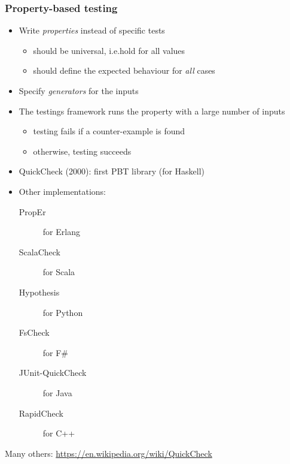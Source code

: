 \documentclass{beamer}
\begin{document}
\begin{frame}[allowframebreaks]
  \frametitle{Property-based testing}

\begin{itemize}
\item Write \emph{properties} instead of specific tests
\begin{itemize}
\item should be universal, i.e.\@ hold for all values
\item should define the expected behaviour for \emph{all} cases
\end{itemize}
\item Specify \emph{generators} for the inputs
\item The testings framework runs the property with
  a large number of inputs
  \begin{itemize}
  \item testing fails if a \alert{counter-example} is found
  \item otherwise, testing succeeds
  \end{itemize}
\end{itemize}

\framebreak

\begin{itemize}
\item QuickCheck (2000): first PBT library (for Haskell)
\item Other implementations:
  \begin{description}
  \item[PropEr] for Erlang
  \item[ScalaCheck] for Scala
  \item[Hypothesis] for Python
  \item[FsCheck] for F\#
  \item[JUnit-QuickCheck] for Java
  \item[RapidCheck] for C++
  \end{description}
\end{itemize}
\bigskip

Many others: \url{https://en.wikipedia.org/wiki/QuickCheck}
\end{frame}
\end{document}
